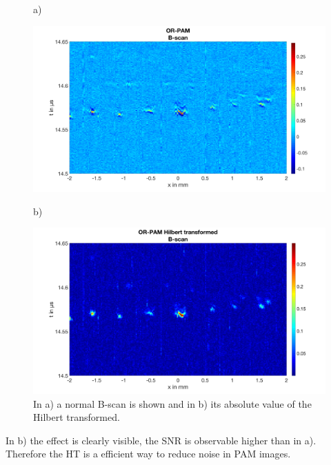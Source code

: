 \begin{figure}[H]
	a)
	\begin{minipage}{\textwidth}		
		\centering
		\includegraphics[width = \textwidth]{02_principles_of_photoacoustics/images/Bscan.png}
	\end{minipage}
	b)
	\begin{minipage}{\textwidth}		
		\centering
		\includegraphics[width = \textwidth]{02_principles_of_photoacoustics/images/BscanHilbert.png}
	\end{minipage}	
	\caption{In a) a normal B-scan is shown and in b) its absolute value of the Hilbert transformed.}
	\label{fig:BsacanHilbert}
\end{figure}

In b) the effect is clearly visible, the SNR is observable higher than in a). \\
Therefore the HT is a efficient way to reduce noise in PAM images. 


